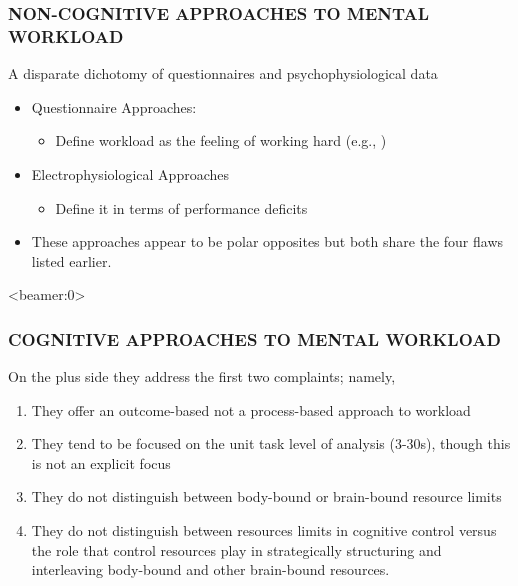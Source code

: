 \documentclass{beamer}
\begin{document}
\begin{frame}
	\frametitle{NON-COGNITIVE APPROACHES TO MENTAL WORKLOAD}
	A disparate dichotomy of questionnaires and psychophysiological data					\begin{itemize} 
		\item Questionnaire Approaches:
		\begin{itemize}
			\item Define workload as the feeling of working hard (e.g., )
		\end{itemize}
		\item Electrophysiological Approaches
		\begin{itemize}
			\item Define it in terms of performance deficits
		\end{itemize}
		\item These approaches appear to be polar opposites but both share the four flaws listed earlier.
	\end{itemize}
\end{frame}

\begin{frame}<beamer:0>
	\frametitle{COGNITIVE APPROACHES TO MENTAL WORKLOAD}
On the plus side they address the first two complaints; namely,
	\begin{enumerate}
		\item They offer an outcome-based not a process-based approach to workload
		\item They tend to be focused on the unit task level of analysis (3-30s), though this is not an explicit focus
	\pause
		\item They do not distinguish between body-bound or brain-bound resource limits
		\item They do not distinguish between resources limits in cognitive control versus the role that control resources play in strategically structuring and interleaving body-bound and other brain-bound resources.
	\end{enumerate}
	\vspace{.7cm}

\end{frame}
\end{document}
